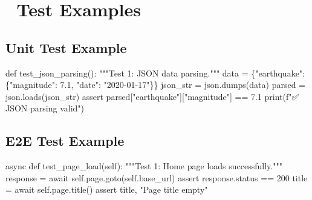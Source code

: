 \documentclass[
  11pt,
  oneside,
  openany]{scrbook}
\newenvironment{Shaded}{\begin{snugshade}}{\end{snugshade}}
\newcommand{\BuiltInTok}[1]{\textcolor[rgb]{0.00,0.23,0.31}{#1}}
\newcommand{\CommentTok}[1]{\textcolor[rgb]{0.37,0.37,0.37}{#1}}
\newcommand{\ControlFlowTok}[1]{\textcolor[rgb]{0.00,0.23,0.31}{#1}}
\newcommand{\DecValTok}[1]{\textcolor[rgb]{0.68,0.00,0.00}{#1}}
\newcommand{\FloatTok}[1]{\textcolor[rgb]{0.68,0.00,0.00}{#1}}
\newcommand{\KeywordTok}[1]{\textcolor[rgb]{0.00,0.23,0.31}{#1}}
\newcommand{\NormalTok}[1]{\textcolor[rgb]{0.00,0.23,0.31}{#1}}
\newcommand{\OperatorTok}[1]{\textcolor[rgb]{0.37,0.37,0.37}{#1}}
\newcommand{\SpecialStringTok}[1]{\textcolor[rgb]{0.13,0.47,0.30}{#1}}
\newcommand{\StringTok}[1]{\textcolor[rgb]{0.13,0.47,0.30}{#1}}
\newcommand{\VariableTok}[1]{\textcolor[rgb]{0.07,0.07,0.07}{#1}}
\begin{document}
\section{📝 Test Examples}\label{test-examples}

\subsection{Unit Test Example}\label{unit-test-example}

\begin{Shaded}
\begin{Highlighting}[]
\KeywordTok{def}\NormalTok{ test\_json\_parsing():}
    \CommentTok{"""Test 1: JSON data parsing."""}
\NormalTok{    data }\OperatorTok{=}\NormalTok{ \{}\StringTok{"earthquake"}\NormalTok{: \{}\StringTok{"magnitude"}\NormalTok{: }\FloatTok{7.1}\NormalTok{, }\StringTok{"date"}\NormalTok{: }\StringTok{"2020{-}01{-}17"}\NormalTok{\}\}}
\NormalTok{    json\_str }\OperatorTok{=}\NormalTok{ json.dumps(data)}
\NormalTok{    parsed }\OperatorTok{=}\NormalTok{ json.loads(json\_str)}
    \ControlFlowTok{assert}\NormalTok{ parsed[}\StringTok{"earthquake"}\NormalTok{][}\StringTok{"magnitude"}\NormalTok{] }\OperatorTok{==} \FloatTok{7.1}
    \BuiltInTok{print}\NormalTok{(}\SpecialStringTok{f"✅ JSON parsing valid"}\NormalTok{)}
\end{Highlighting}
\end{Shaded}

\subsection{E2E Test Example}\label{e2e-test-example}

\begin{Shaded}
\begin{Highlighting}[]
\ControlFlowTok{async} \KeywordTok{def}\NormalTok{ test\_page\_load(}\VariableTok{self}\NormalTok{):}
    \CommentTok{"""Test 1: Home page loads successfully."""}
\NormalTok{    response }\OperatorTok{=} \ControlFlowTok{await} \VariableTok{self}\NormalTok{.page.goto(}\VariableTok{self}\NormalTok{.base\_url)}
    \ControlFlowTok{assert}\NormalTok{ response.status }\OperatorTok{==} \DecValTok{200}
\NormalTok{    title }\OperatorTok{=} \ControlFlowTok{await} \VariableTok{self}\NormalTok{.page.title()}
    \ControlFlowTok{assert}\NormalTok{ title, }\StringTok{"Page title empty"}
\end{Highlighting}
\end{Shaded}
\end{document}
